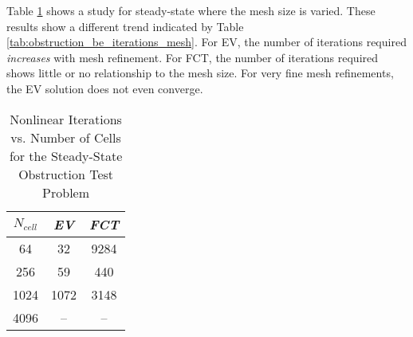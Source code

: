 Table \ref{tab:obstruction_ss_iterations_mesh} shows a study for steady-state
where the mesh size is varied. These results show a different trend indicated
by Table \ref{tab:obstruction_be_iterations_mesh}.
For EV, the number of iterations required \emph{increases} with mesh refinement.
For FCT, the number of iterations required shows little or no relationship to
the mesh size. For very fine mesh refinements, the EV solution does not even
converge.

\begin{table}[htb]\caption{Nonlinear Iterations vs. Number of Cells for the
  Steady-State Obstruction Test Problem}
\label{tab:obstruction_ss_iterations_mesh}
\centering
\begin{tabular}{c c c}\toprule
$N_{cell}$ & \emph{EV} & \emph{FCT}\\\midrule
64         & 32 & 9284\\
256        & 59 & 440\\
1024       & 1072 & 3148\\
4096       & --   & --\\
\bottomrule\end{tabular}
\end{table}

\clearpage


